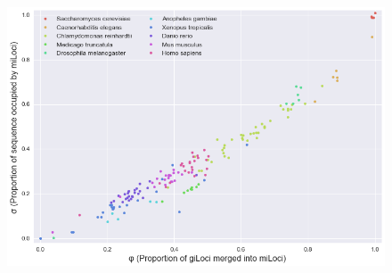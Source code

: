 \begin{figure}[h]
\includegraphics[width=6in]{Assets/Graphics/iLoci/compactness-shuffled.png}
\centering
\caption{~}
\label{Fig:CompactnessShuffled}
\end{figure}

\clearpage


